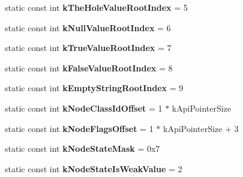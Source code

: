 \begin{DoxyCompactItemize}
\item 
\mbox{\label{classv8_1_1internal_1_1Internals_ac07a35d3efef0c107062b3eb88696e31}} 
static const int {\bfseries k\+The\+Hole\+Value\+Root\+Index} = 5
\item 
\mbox{\label{classv8_1_1internal_1_1Internals_ab311cf753ec5c968052bd83ef21e83f8}} 
static const int {\bfseries k\+Null\+Value\+Root\+Index} = 6
\item 
\mbox{\label{classv8_1_1internal_1_1Internals_a93abd58b178eca469bade28e68b5c59e}} 
static const int {\bfseries k\+True\+Value\+Root\+Index} = 7
\item 
\mbox{\label{classv8_1_1internal_1_1Internals_a90b6837aa368bbe4ffd914e6f753b167}} 
static const int {\bfseries k\+False\+Value\+Root\+Index} = 8
\item 
\mbox{\label{classv8_1_1internal_1_1Internals_a6f669f3d98fe653b281b26be3bc0655a}} 
static const int {\bfseries k\+Empty\+String\+Root\+Index} = 9
\item 
\mbox{\label{classv8_1_1internal_1_1Internals_af4fb6d499cb87f03031ad4d6be6bcd8f}} 
static const int {\bfseries k\+Node\+Class\+Id\+Offset} = 1 $\ast$ k\+Api\+Pointer\+Size
\item 
\mbox{\label{classv8_1_1internal_1_1Internals_aee5606f2a44d43d8dafe344e0bb753ef}} 
static const int {\bfseries k\+Node\+Flags\+Offset} = 1 $\ast$ k\+Api\+Pointer\+Size + 3
\item 
\mbox{\label{classv8_1_1internal_1_1Internals_a853acc088978d38a5a69091cf857a46d}} 
static const int {\bfseries k\+Node\+State\+Mask} = 0x7
\item 
\mbox{\label{classv8_1_1internal_1_1Internals_a8a5d4cc92a6952c2a50922c77a606e68}} 
static const int {\bfseries k\+Node\+State\+Is\+Weak\+Value} = 2
\item 
\mbox{\label{classv8_1_1internal_1_1Internals_a843b53b17257ecd957eade0d9f21c5ab}} 

\end{DoxyCompactItemize}
